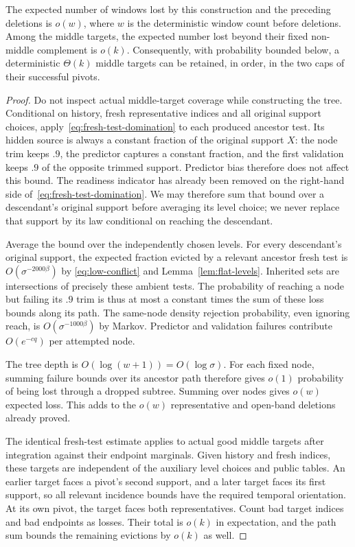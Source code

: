 \begin{lemma}\label{lem:pivot-retention}
The expected number of windows lost by this construction and the
preceding deletions is $o(w)$, where $w$ is the deterministic window
count before deletions.  Among the middle targets, the expected number
lost beyond their fixed non-middle complement is $o(k)$.
Consequently, with probability bounded below, a deterministic
$\Theta(k)$ middle targets can be retained, in order, in the two caps
of their successful pivots.
\end{lemma}

\begin{proof}
Do not inspect actual middle-target coverage while constructing the
tree.  Conditional on history, fresh representative indices and all
original support choices, apply~\eqref{eq:fresh-test-domination} to
each produced ancestor test.  Its hidden source is always a constant
fraction of the original support $X$: the node trim keeps $.9$, the
predictor captures a constant fraction, and the first validation keeps
$.9$ of the opposite trimmed support.  Predictor bias therefore does
not affect this bound.
The readiness indicator has already been removed on the right-hand side
of~\eqref{eq:fresh-test-domination}.  We may therefore sum that bound
over a descendant's original support before averaging its level choice;
we never replace that support by its law conditional on reaching the
descendant.

Average the bound over the independently chosen levels.  For every
descendant's original support, the expected fraction evicted by a
relevant ancestor fresh test is $O(\sigma^{-2000\beta})$ by
\eqref{eq:low-conflict} and Lemma~\ref{lem:flat-levels}.
Inherited sets are intersections of precisely these ambient tests.
The probability of reaching a node but failing its $.9$ trim is thus
at most a constant times the sum of these loss bounds along its path.
The same-node density rejection probability, even ignoring reach, is
$O(\sigma^{-1000\beta})$ by Markov.  Predictor and validation failures
contribute $O(e^{-cq})$ per attempted node.

The tree depth is $O(\log(w+1))=O(\log\sigma)$.
For each fixed node, summing failure bounds over its ancestor path
therefore gives $o(1)$ probability of being lost through a dropped
subtree.  Summing over nodes gives $o(w)$ expected loss.  This adds to
the $o(w)$ representative and open-band deletions already proved.

The identical fresh-test estimate applies to actual good middle targets
after integration against their endpoint marginals.  Given history and
fresh indices, these targets are independent of the auxiliary level
choices and public tables.  An earlier target faces a pivot's second
support, and a later target faces its first support, so all relevant
incidence bounds have the required temporal orientation.  At its own
pivot, the target faces both representatives.  Count bad target indices
and bad endpoints as losses.  Their total is $o(k)$ in expectation,
and the path sum bounds the remaining evictions by $o(k)$ as well.


\end{proof}
